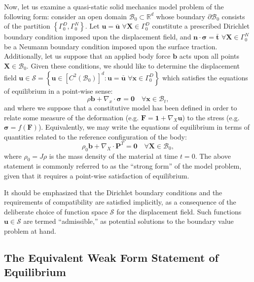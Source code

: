 Now, let us examine a quasi-static solid mechanics model problem of the following form: consider an open domain $\mathcal{B}_0 \subset \mathbb{R}^d$ whose boundary $\partial \mathcal{B}_0$ consists of the partition $\left\{ \Gamma^D_0, \Gamma^N_0 \right\}$. Let $\mathbf{u} = \bar{\mathbf{u}} \, \, \forall \mathbf{X} \in \Gamma^D_0$ constitute a prescribed Dirichlet boundary condition imposed upon the displacement field, and $\mathbf{n} \cdot \boldsymbol{\sigma} = \bar{\mathbf{t}} \, \, \forall \mathbf{X} \in \Gamma^N_0$ be a Neumann boundary condition imposed upon the surface traction. Additionally, let us suppose that an applied body force $\mathbf{b}$ acts upon all points $\mathbf{X} \in \mathcal{B}_0$. Given these conditions, we should like to determine the displacement field $\mathbf{u} \in \mathcal{S} = \left\{ \mathbf{u} \in \left[ C^2 (\mathcal{B}_0) \right]^d \colon \mathbf{u} = \bar{\mathbf{u}} \, \, \forall \mathbf{x} \in \Gamma^D_0 \right\}$ which satisfies the equations of equilibrium in a point-wise sense:
\begin{equation}
  \rho \mathbf{b} + \nabla_x \cdot \boldsymbol{\sigma} = \mathbf{0} \quad \forall \mathbf{x} \in \mathcal{B}_t,
\end{equation}
and where we suppose that a constitutive model has been defined in order to relate some measure of the deformation (e.g. $\mathbf{F} = \mathbf{1} + \nabla_X \mathbf{u}$) to the stress (e.g. $\boldsymbol{\sigma} = f (\mathbf{F})$). Equivalently, we may write the equations of equilibrium in terms of quantities related to the reference configuration of the body:
\begin{equation}
  \rho_0 \mathbf{b} + \nabla_X \cdot \mathbf{P}^T = \mathbf{0} \quad \forall \mathbf{X} \in \mathcal{B}_0,
\end{equation}
where $\rho_0 = J \rho$ is the mass density of the material at time $t = 0$. The above statement is commonly referred to as the ``strong form'' of the model problem, given that it requires a point-wise satisfaction of equilibrium.

It should be emphasized that the Dirichlet boundary conditions and the requirements of compatibility are satisfied implicitly, as a consequence of the deliberate choice of function space $\mathcal{S}$ for the displacement field. Such functions $\mathbf{u} \in \mathcal{S}$ are termed ``admissible,'' as potential solutions to the boundary value problem at hand.

\subsection*{The Equivalent Weak Form Statement of Equilibrium}

